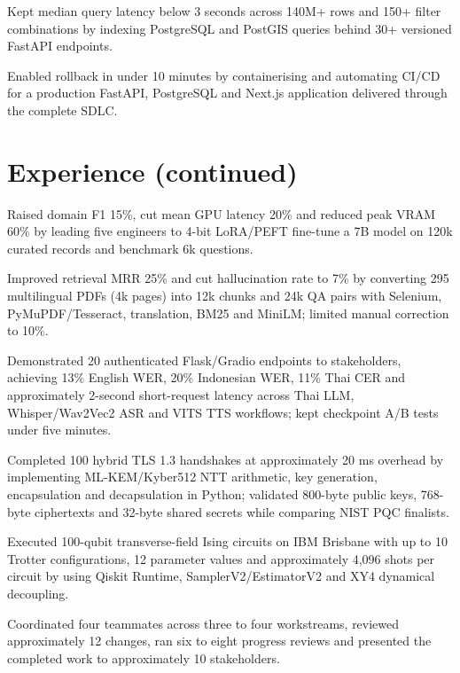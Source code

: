 \begin{resumeBullets}
  \item Kept median query latency below 3 seconds across 140M+ rows and 150+ filter combinations by indexing PostgreSQL and PostGIS queries behind 30+ versioned FastAPI endpoints.
  \item Enabled rollback in under 10 minutes by containerising and automating CI/CD for a production FastAPI, PostgreSQL and Next.js application delivered through the complete SDLC.
\end{resumeBullets}

\newpage
\section{Experience (continued)}

\begin{resumeBullets}
  \item Raised domain F1 15\%, cut mean GPU latency 20\% and reduced peak VRAM 60\% by leading five engineers to 4-bit LoRA/PEFT fine-tune a 7B model on 120k curated records and benchmark 6k questions.
  \item Improved retrieval MRR 25\% and cut hallucination rate to 7\% by converting 295 multilingual PDFs (4k pages) into 12k chunks and 24k QA pairs with Selenium, PyMuPDF/Tesseract, translation, BM25 and MiniLM; limited manual correction to 10\%.
  \item Demonstrated 20 authenticated Flask/Gradio endpoints to stakeholders, achieving 13\% English WER, 20\% Indonesian WER, 11\% Thai CER and approximately 2-second short-request latency across Thai LLM, Whisper/Wav2Vec2 ASR and VITS TTS workflows; kept checkpoint A/B tests under five minutes.
  \item Completed 100 hybrid TLS 1.3 handshakes at approximately 20 ms overhead by implementing ML-KEM/Kyber512 NTT arithmetic, key generation, encapsulation and decapsulation in Python; validated 800-byte public keys, 768-byte ciphertexts and 32-byte shared secrets while comparing NIST PQC finalists.
  \item Executed 100-qubit transverse-field Ising circuits on IBM Brisbane with up to 10 Trotter configurations, 12 parameter values and approximately 4,096 shots per circuit by using Qiskit Runtime, SamplerV2/EstimatorV2 and XY4 dynamical decoupling.
  \item Coordinated four teammates across three to four workstreams, reviewed approximately 12 changes, ran six to eight progress reviews and presented the completed work to approximately 10 stakeholders.
\end{resumeBullets}

